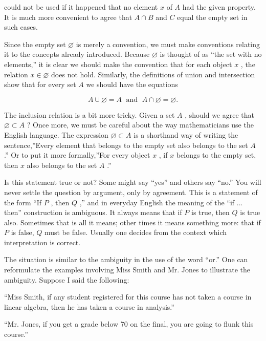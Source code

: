 could not be used if it happened that no element \(x\) of \(A\) had the given property. It is much more convenient to agree that \(A \cap  B\) and \(C\) equal the empty set in such cases.

Since the empty set \(\varnothing\) is merely a convention, we must make conventions relating it to the concepts already introduced. Because \(\varnothing\) is thought of as ``the set with no elements,'' it is clear we should make the convention that for each object \(x\) , the relation \(x \in  \varnothing\) does not hold. Similarly, the definitions of union and intersection show that for every set \(A\) we should have the equations

\[
A \cup  \varnothing  = A\;\text{ and }\;A \cap  \varnothing  = \varnothing .
\]

The inclusion relation is a bit more tricky. Given a set \(A\) , should we agree that \(\varnothing  \subset  A\) ? Once more, we must be careful about the way mathematicians use the English language. The expression \(\varnothing  \subset  A\) is a shorthand way of writing the sentence,''Every element that belongs to the empty set also belongs to the set \(A\) .'' Or to put it more formally,''For every object \(x\) , if \(x\) belongs to the empty set, then \(x\) also belongs to the set \(A\) .''

Is this statement true or not? Some might say ``yes'' and others say ``no.'' You will never settle the question by argument, only by agreement. This is a statement of the form ``If \(P\) , then \(Q\) ,'' and in everyday English the meaning of the ``if ... then'' construction is ambiguous. It always means that if \(P\) is true, then \(Q\) is true also. Sometimes that is all it means; other times it means something more: that if \(P\) is false, \(Q\) must be false. Usually one decides from the context which interpretation is correct.

The situation is similar to the ambiguity in the use of the word ``or.'' One can reformulate the examples involving Miss Smith and Mr. Jones to illustrate the ambiguity. Suppose I said the following:

\begin{centeredblock}
``Miss Smith, if any student registered for this course has not taken a course in linear algebra, then he has taken a course in analysis.''

``Mr. Jones, if you get a grade below 70 on the final, you are going to flunk this course.''
\end{centeredblock}

